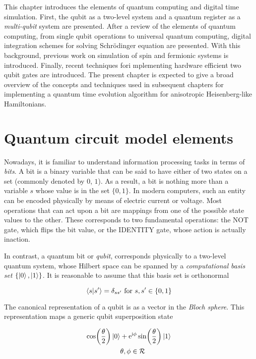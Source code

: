 This chapter introduces the elements of quantum computing and digital time simulation. First, the qubit as a two-level system and a quantum register as a \textit{multi-qubit} system are presented. After a review of the elements of quantum computing, from single qubit operations to universal quantum computing, digital integration schemes for solving Schrödinger equation are presented. With this background, previous work on simulation of spin and fermionic systems is introduced. Finally, recent techniques fori mplementing hardware efficient two qubit gates are introduced. The present chapter is expected to give a broad overview of the concepts and techniques used in subsequent chapters for implementing a quantum time evolution algorithm for anisotropic Heisenberg-like Hamiltonians.

\section{Quantum circuit model elements}
\label{sec:fundaQC}

  Nowadays, it is familiar to understand information processing tasks in terms of \textit{bits}. A bit is a binary variable that can be said to have either of two states on a set (commonly denoted by $0$, $1$). As a result, a bit is nothing more than a variable $s$ whose value is in the set $\{0,1\}$. In modern computers, such an entity can be encoded physically by means of electric current or voltage. Most operations that can act upon a bit are mappings from one of the possible state values to the other. These corresponds to two fundamental operations: the NOT gate, which flips the bit value, or the IDENTITY gate, whose action is actually inaction.

  In contrast, a quantum bit or \textit{qubit}, corresponds physically to a two-level quantum system, whose Hilbert space can be spanned by a \textit{computational basis set} $\{\ket{0}, \ket{1}\}$. It is reasonable to assume that this basis set is orthonormal

  \begin{equation}
    \braket{s}{s'} = \delta_{ss'} \text{ for } s, s' \in \{0,1\}
    \label{eq:comp-basis}
  \end{equation}

  The canonical representation of a qubit is as a vector in the \textit{Bloch sphere}. This representation maps a generic qubit superposition state

  \begin{align}
    \cos(\frac{\theta}{2}) \ket{0} &  + \mathrm{e}^{\mathrm{i}\phi}\sin(\frac{\theta}{2})\ket{1} \\
    & \theta, \phi \in \mathcal{R}
    \label{eq:qubit-state}
  \end{align}

